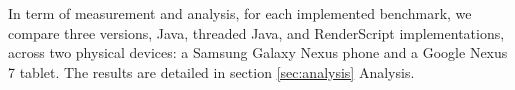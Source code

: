 In term of measurement and analysis, for each implemented benchmark, we compare
three versions, Java, threaded Java, and RenderScript implementations, across
two physical devices: a Samsung Galaxy Nexus phone and a Google Nexus 7 tablet.
The results are detailed in section \ref{sec:analysis} Analysis.

